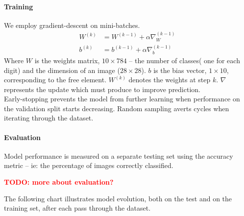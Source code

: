 \documentclass[a4paper]{article}
\newcommand{\TODO}[1]{\noindent \textbf{\textcolor{red}{TODO: #1}}}
\begin{document}
\paragraph{Training} We employ gradient-descent on mini-batches. 
\begin{align*}
W^{(k)} &= W^{(k-1)} + \alpha \nabla_W^{(k-1)} \\ 
b^{(k)} &= b^{(k-1)} + \alpha \nabla_b^{(k-1)}
\end{align*}
Where $W$ is the weights matrix, $10 \times 784$ -- the number of classes( one for each digit) and the dimension of an image ($28 \times 28$). $b$ is the bias vector, $1 \times 10$, corresponding to the free element. $W^{(k)}$ denotes the weights at step $k$. $\nabla$ represents the update which must produce to improve prediction.
\\
Early-stopping prevents the model from further learning when performance on the validation split starts decreasing. Random sampling averts cycles when iterating through the dataset.

\paragraph{Evaluation}
Model performance is measured on a separate testing set using the accuracy metric -- ie: the percentage of images correctly classified.

\TODO{more about evaluation?}

\noindent The following chart illustrates model evolution, both on the test and on the training set, after each pass through the dataset.

\begin{center}
\end{center}
\end{document}
